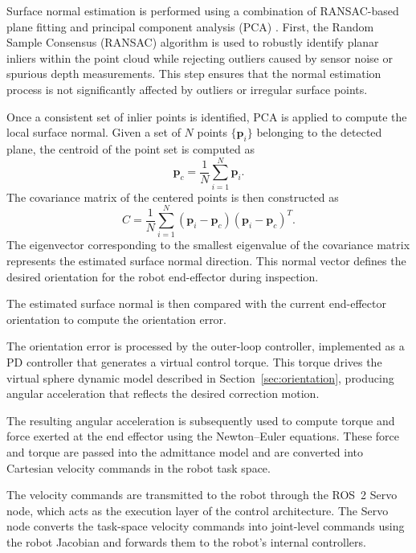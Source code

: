 \documentclass[journal]{IEEEtran}
\begin{document}
Surface normal estimation is performed using a combination of   RANSAC-based plane fitting \cite{fischler1981random} and principal component analysis (PCA) \cite{winn2023model}. First, the Random Sample Consensus (RANSAC) algorithm is used to robustly identify planar inliers within the point cloud while rejecting outliers caused by sensor noise or spurious depth measurements. This step ensures that the normal estimation process is not significantly affected by outliers or irregular surface points.

Once a consistent set of inlier points is identified, PCA is applied to compute the local surface normal. Given a set of $N$ points $\{\mathbf{p}_i\}$ belonging to the detected plane, the centroid of the point set is computed as
%
\begin{equation}
\mathbf{p}_c = \frac{1}{N} \sum_{i=1}^{N} \mathbf{p}_i.
\end{equation}
%
The covariance matrix of the centered points is then constructed as
%
\begin{equation}
C = \frac{1}{N} \sum_{i=1}^{N} (\mathbf{p}_i - \mathbf{p}_c)(\mathbf{p}_i - \mathbf{p}_c)^T.
\end{equation}
%
The eigenvector corresponding to the smallest eigenvalue of the covariance matrix represents the estimated surface normal direction. This normal vector defines the desired orientation for the robot end-effector during inspection.

The estimated surface normal is then compared with the current end-effector orientation to compute the orientation error. 

The orientation error is processed by the outer-loop controller, implemented as a PD controller that generates a virtual control torque. This torque drives the virtual sphere dynamic model described in Section~\ref{sec:orientation}, producing angular acceleration that reflects the desired correction motion.

The resulting angular acceleration is subsequently used to compute torque and force exerted at the end effector using the Newton--Euler equations. These force and torque are passed into the admittance model and are converted into Cartesian velocity commands in the robot task space.

The velocity commands are transmitted to the robot through the ROS~2 Servo node, which acts as the execution layer of the control architecture. The Servo node converts the task-space velocity commands into joint-level commands using the robot Jacobian and forwards them to the robot's internal controllers.
\end{document}
